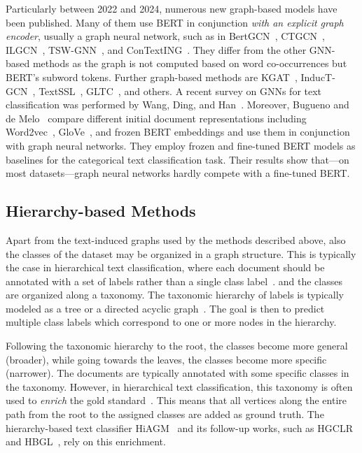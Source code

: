 \documentclass[acmsmall,nonacm]{acmart}
\begin{document}
Particularly between 2022 and 2024, numerous new graph-based models have been published.
Many of them use BERT in conjunction \textit{with an explicit graph encoder}, usually a graph neural network, such as in BertGCN~\cite{DBLP:conf/acl/LinMSHKLW21}, CTGCN~\cite{ctgcn}, ILGCN~\cite{ilgcn}, TSW-GNN~\cite{tsw-gnn}, and ConTextING~\cite{DBLP:conf/coling/HuangCC22}.
They differ from the other GNN-based methods as the graph is not computed based on word co-occurrences but BERT's subword tokens.
Further graph-based methods are KGAT~\cite{DBLP:conf/nlpcc/WangWYZSJWZ22}, InducT-GCN~\cite{induct-gcn}, TextSSL~\cite{textssl2022}, GLTC~\cite{gltc2023}, and others.
A recent survey on GNNs for text classification was performed by Wang, Ding, and Han~\cite{wang2023graph}.
Moreover, Bugueno and de Melo~\cite{buguenoConnectingDotsWhat2023} compare different initial document representations including Word2vec~\cite{DBLP:conf/nips/MikolovSCCD13}, GloVe~\cite{DBLP:conf/emnlp/PenningtonSM14}, and frozen BERT embeddings and use them in conjunction with graph neural networks. 
They employ frozen and fine-tuned BERT models as baselines for the categorical text classification task. 
Their results show that---on most datasets---graph neural networks hardly compete with a fine-tuned BERT.

\subsection{Hierarchy-based Methods}
\label{sec:rw:hierarcy-based-methods}
Apart from the text-induced graphs used by the methods described above, also the classes of the dataset may be organized in a graph structure.
This is typically the case in hierarchical text classification, where each document should be annotated with a set of labels rather than a single class label~\cite{DBLP:journals/csur/Sebastiani02}. 
and the classes are organized along a taxonomy. 
The taxonomic hierarchy of labels is typically modeled as a tree or a directed acyclic graph~\cite{shen-etal-2021-taxoclass,hiagm,pengHierarchicalTaxonomyAwareAttentional2021}. 
The goal is then to predict multiple class labels which correspond to one or more nodes in the hierarchy.

Following the taxonomic hierarchy to the root, the classes become more general (broader), while going towards the leaves, the classes become more specific (narrower).
The documents are typically annotated with some specific classes in the taxonomy.
However, in hierarchical text classification, this taxonomy is often used to \emph{enrich} the gold standard~\cite{hiagm}. 
This means that all vertices along the entire path from the root to the assigned classes are added as ground truth.
The hierarchy-based text classifier HiAGM~\cite{hiagm} and its follow-up works, such as HGCLR~\cite{DBLP:conf/acl/WangWH0W22} and HBGL~\cite{hbgl}, rely on this enrichment.
\end{document}
